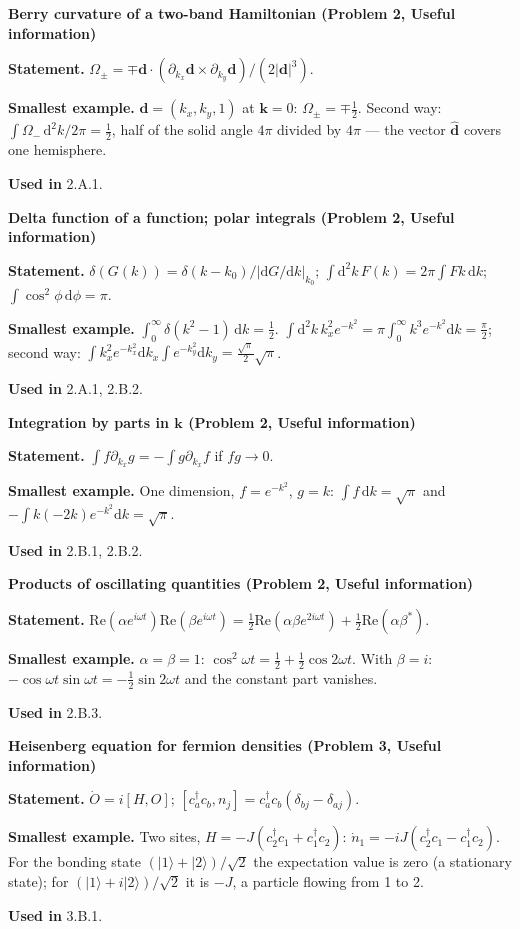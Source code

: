 \documentclass[11pt,a4paper]{article}
\newcommand{\ket}[1]{\lvert #1\rangle}
\newcommand{\dd}{\mathrm d}
\newcommand{\smallheading}[1]{\par\Needspace{6\baselineskip}\medskip\textbf{#1}\par}
\begin{document}
\smallheading{Berry curvature of a two-band Hamiltonian (Problem 2, Useful information)}
\textbf{Statement.} $\Omega_\pm=\mp\bm d\cdot(\partial_{k_x}\bm d\times\partial_{k_y}\bm d)/(2|\bm d|^3)$.\par
\textbf{Smallest example.} $\bm d=(k_x,k_y,1)$ at $\bm k=0$: $\Omega_\pm=\mp\frac12$. Second way: $\int\Omega_-\,\dd^2k/2\pi=\frac12$, half of the solid angle $4\pi$ divided by $4\pi$ --- the vector $\hat{\bm d}$ covers one hemisphere.\par
\textbf{Used in} 2.A.1.

\smallheading{Delta function of a function; polar integrals (Problem 2, Useful information)}
\textbf{Statement.} $\delta(G(k))=\delta(k-k_0)/|\dd G/\dd k|_{k_0}$; $\int\dd^2k\,F(k)=2\pi\int Fk\,\dd k$; $\int\cos^2\phi\,\dd\phi=\pi$.\par
\textbf{Smallest example.} $\int_0^\infty\delta(k^2-1)\,\dd k=\frac12$. $\int\dd^2k\,k_x^2e^{-k^2}=\pi\int_0^\infty k^3e^{-k^2}\dd k=\frac\pi2$; second way: $\int k_x^2e^{-k_x^2}\dd k_x\int e^{-k_y^2}\dd k_y=\frac{\sqrt\pi}2\sqrt\pi$.\par
\textbf{Used in} 2.A.1, 2.B.2.

\smallheading{Integration by parts in $\bm k$ (Problem 2, Useful information)}
\textbf{Statement.} $\int f\partial_{k_x}g=-\int g\partial_{k_x}f$ if $fg\to0$.\par
\textbf{Smallest example.} One dimension, $f=e^{-k^2}$, $g=k$: $\int f\,\dd k=\sqrt\pi$ and $-\int k(-2k)e^{-k^2}\dd k=\sqrt\pi$.\par
\textbf{Used in} 2.B.1, 2.B.2.

\smallheading{Products of oscillating quantities (Problem 2, Useful information)}
\textbf{Statement.} $\mathrm{Re}(\alpha e^{i\omega t})\mathrm{Re}(\beta e^{i\omega t})=\frac12\mathrm{Re}(\alpha\beta e^{2i\omega t})+\frac12\mathrm{Re}(\alpha\beta^*)$.\par
\textbf{Smallest example.} $\alpha=\beta=1$: $\cos^2\omega t=\frac12+\frac12\cos2\omega t$. With $\beta=i$: $-\cos\omega t\sin\omega t=-\frac12\sin2\omega t$ and the constant part vanishes.\par
\textbf{Used in} 2.B.3.

\smallheading{Heisenberg equation for fermion densities (Problem 3, Useful information)}
\textbf{Statement.} $\dot O=i[H,O]$; $[c_a^\dagger c_b,n_j]=c_a^\dagger c_b(\delta_{bj}-\delta_{aj})$.\par
\textbf{Smallest example.} Two sites, $H=-J(c_2^\dagger c_1+c_1^\dagger c_2)$: $\dot n_1=-iJ(c_2^\dagger c_1-c_1^\dagger c_2)$. For the bonding state $(\ket1+\ket2)/\sqrt2$ the expectation value is zero (a stationary state); for $(\ket1+i\ket2)/\sqrt2$ it is $-J$, a particle flowing from 1 to 2.\par
\textbf{Used in} 3.B.1.
\end{document}
